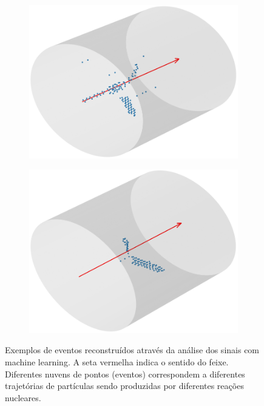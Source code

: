 \documentclass[a4paper,12pt,oneside]{book}
\begin{document}
\begin{figure}[H]
\begin{subfigure}[b]{0.48\textwidth}
        \includegraphics[scale=0.38]{figs/ex_ev_3.png}
        \caption{}
        \label{subfig:ex_ev_3}
    \end{subfigure}%
    \hfill
    \begin{subfigure}[b]{0.48\textwidth}
        \centering
        \includegraphics[scale=0.38]{figs/ex_ev_4.png}
        \caption{}
        \label{subfig:ex_ev_4}
    \end{subfigure}
\caption{Exemplos de eventos reconstruídos através da análise dos sinais com machine learning. A seta vermelha indica o sentido do feixe. Diferentes nuvens de pontos (eventos) correspondem a diferentes trajetórias de partículas sendo produzidas por diferentes reações nucleares.}
\label{fig:ex_eventos}
\end{figure}
\end{document}
